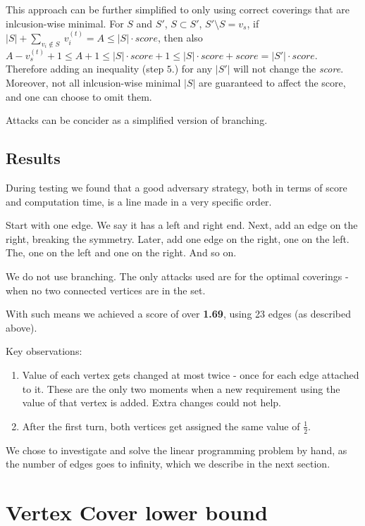 \documentclass[12pt, A4]{article}
\begin{document}
This approach can be further simplified to only using correct coverings that are inlcusion-wise minimal. For $S$ and $S'$, $S \subset S'$, $S' \setminus S = {v_s}$, if $|S| + \sum_{v_i \not \in S} \ v_i^{(t)} = A \le |S| \cdot score$, then also $A - v_s^{(t)} + 1 \le A + 1 \le |S| \cdot score + 1 \le |S| \cdot score + score = |S'| \cdot score$. Therefore adding an inequality (step $5.$) for any $|S'|$ will not change the \textit{score}. Moreover, not all inlcusion-wise minimal $|S|$ are guaranteed to affect the score, and one can choose to omit them.

Attacks can be concider as a simplified version of branching.


\subsection{Results}
During testing we found that a good adversary strategy, both in terms of score and computation time, is a line made in a very specific order.

Start with one edge. We say it has a left and right end. Next, add an edge on the right, breaking the symmetry. Later, add one edge on the right, one on the left. The, one on the left and one on the right. And so on.

We do not use branching. The only attacks used are for the optimal coverings - when no two connected vertices are in the set.

With such means we achieved a score of over \textbf{1.69}, using 23 edges (as described above).

Key observations:
\begin{enumerate}
    \item Value of each vertex gets changed at most twice - once for each edge attached to it. These are the only two moments when a new requirement using the value of that vertex is added. Extra changes could not help.
    \item After the first turn, both vertices get assigned the same value of $\frac{1}{2}$.
\end{enumerate}

We chose to investigate and solve the linear programming problem by hand, as the number of edges goes to infinity, which we describe in the next section.



\section{Vertex Cover lower bound}
\end{document}
